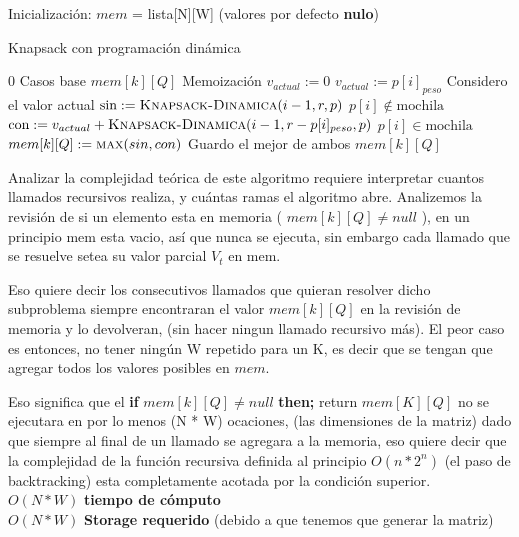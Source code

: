 \documentclass[fleqn, 11pt]{article}
\begin{document}
Inicialización: \quad \textit{$mem$} \quad = lista[N][W] (valores por defecto \textbf{nulo})

\begin{algorithm}
\caption{Knapsack con programación dinámica}
\begin{algorithmic}[1]
	\State \Return $0$
\Comment Casos base
\EndIf
	\State	\Return $mem[k][Q]$
	\Comment Memoización
\EndIf
\State $v_{actual} := 0$
	\State	$v_{actual} := p[i]_{peso}$
	\Comment Considero el valor actual
\EndIf
\State $\text{sin} := \Call{Knapsack-Dinamica}{i - 1, r, p}$
\Comment $p[i] \not \in \text{mochila}$
\State $\text{con} := v_{actual} + \Call{Knapsack-Dinamica}{i - 1, r - p[i]_{peso}, p}$
\Comment $p[i] \in \text{mochila}$
\State $mem[k][Q] := \Call{max}{sin, con}$
\Comment Guardo el mejor de ambos
\State \Return $mem[k][Q]$
\EndFunction
\end{algorithmic}
\end{algorithm}

Analizar la complejidad teórica de este algoritmo requiere interpretar cuantos llamados recursivos realiza, y cuántas ramas el algoritmo abre. Analizemos la revisión de si un elemento esta en memoria ( $mem[k][Q] \neq null$ ), en un principio mem esta vacio,  así que nunca se ejecuta, sin embargo cada llamado que se resuelve setea su valor parcial \textit{$V_t$} en mem.

Eso quiere decir los consecutivos llamados que quieran resolver dicho subproblema siempre encontraran el valor $mem[k][Q]$ en la revisión de memoria y lo devolveran, (sin hacer ningun llamado recursivo más). El peor caso es entonces, no tener ningún W repetido para un K, es decir que se tengan que agregar todos los valores posibles en $mem$.

Eso significa que el \textbf{if} $mem[k][Q] \neq null$ \textbf{then;} return $mem[K][Q]$ no se ejecutara en por lo menos (N * W) ocaciones, (las dimensiones de la matriz) dado que siempre al final de un llamado se agregara a la memoria, eso quiere decir que la complejidad de la función recursiva definida al principio $O(n*2^n)$ (el paso de backtracking) esta completamente acotada por la condición superior. \\

\small $O(N * W)$ \textbf{tiempo de cómputo} \\
\small $O(N * W)$ \textbf{Storage requerido} (debido a que tenemos que generar la matriz) \\
\end{document}
